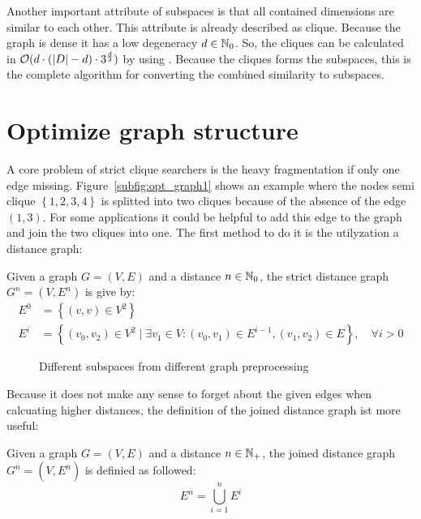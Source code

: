 Another important attribute of subspaces is that all contained dimensions are similar to each other. This attribute is already described as clique. Because the graph is dense it has a low degeneracy $d \in \mathbb{N}_0$. So, the cliques can be calculated in $\mathcal{O}(d \cdot (\left|D\right| - d) \cdot 3^{\frac{d}{3}})$ by using \cite{listingCliques}. Because the cliques forms the subspaces, this is the complete algorithm for converting the combined similarity to subspaces.

\section{Optimize graph structure}
A core problem of strict clique searchers is the heavy fragmentation if only one edge missing. Figure~\ref{subfig:opt_graph1} shows an example where the nodes semi clique $\left\{1,2,3,4\right\}$ is splitted into two cliques because of the absence of the edge $(1,3)$. For some applications it could be helpful to add this edge to the graph and join the two cliques into one. The first method to do it is the utilyzation a distance graph:
\begin{envdef}
	Given a graph $G=(V,E)$ and a distance $n \in \mathbb{N}_0$, the strict distance graph $G^n=(V,E^n)$ is give by:
	\begin{align}
		E^0 &= \left\{ (v,v) \in V^2 \right\}\\
		E^i &= \left\{ (v_0,v_2) \in V^2 \mid \exists v_1 \in V : (v_0,v_1) \in E^{i-1}, (v_1,v_2) \in E \right\}, \quad \forall i>0
	\end{align}
\end{envdef}
\begin{figure}
	\caption{Different subspaces from different graph preprocessing}
	\label{fig:opt_graph}
	\centering
	\hfill
	\hfill
	\subfloat[\label{subfig:opt_graph3}Filtered distance with $\alpha=\frac23$]{}
	\hfill
	\subfloat[\label{subfig:opt_graph4}Bidirectional filtered distance with $\alpha=\frac23$]{}
\end{figure}
Because it does not make any sense to forget about the given edges when calcuating higher distances, the definition of the joined distance graph ist more useful:
\begin{envdef}
	Given a graph $G=(V,E)$ and a distance $n \in \mathbb{N}_+$, the joined distance graph $G^{\overline{n}}=(V,E^{\overline{n}})$ is definied as followed:
	\begin{equation}
		E^{\overline{n}} = \bigcup_{i=1}^n E^i
	\end{equation}
\end{envdef}
